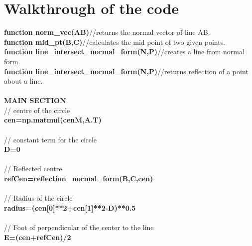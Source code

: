\documentclass[12pt]{article}
\begin{document}
\section{ Walkthrough of the code }

\textbf{function norm\_vec(AB)}\hfill //returns the normal vector of line AB.\\
\textbf{function mid\_pt(B,C)}\hfill //calculates the mid point of two given points.\\
\textbf{function line\_intersect\_normal\_form(N,P)}\hfill //creates a line from normal form.\\
\textbf{function line\_intersect\_normal\_form(N,P)}\hfill //returns reflection of a point about a line.\\
\\
\textbf{MAIN SECTION}\\
// centre of the circle \\
\textbf{cen=np.matmul(cenM,A.T)} \\
\\
// constant term for the circle \\
\textbf{D=0} \\
\\
// Reflected centre \\
\textbf{refCen=reflection\_normal\_form(B,C,cen)} \\
\\
// Radius of the circle \\
\textbf{radius=(cen[0]**2+cen[1]**2-D)**0.5} \\
\\
// Foot of perpendicular of the center to the line \\
\textbf{E=(cen+refCen)/2} \\


 
\end{document}
